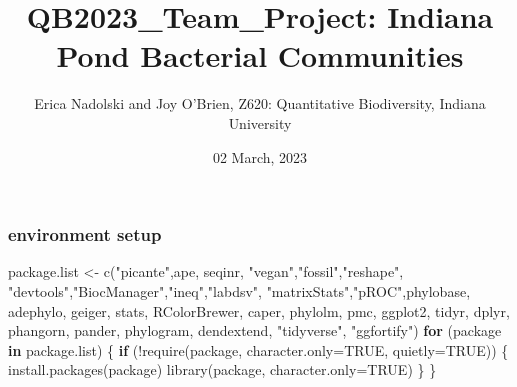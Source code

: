 \documentclass[
]{article}
\title{QB2023\_Team\_Project: Indiana Pond Bacterial Communities}
\author{Erica Nadolski and Joy O'Brien, Z620: Quantitative Biodiversity,
Indiana University}
\date{02 March, 2023}
\newenvironment{Shaded}{\begin{snugshade}}{\end{snugshade}}
\newcommand{\AttributeTok}[1]{\textcolor[rgb]{0.77,0.63,0.00}{#1}}
\newcommand{\ConstantTok}[1]{\textcolor[rgb]{0.00,0.00,0.00}{#1}}
\newcommand{\ControlFlowTok}[1]{\textcolor[rgb]{0.13,0.29,0.53}{\textbf{#1}}}
\newcommand{\FunctionTok}[1]{\textcolor[rgb]{0.00,0.00,0.00}{#1}}
\newcommand{\NormalTok}[1]{#1}
\newcommand{\OtherTok}[1]{\textcolor[rgb]{0.56,0.35,0.01}{#1}}
\newcommand{\SpecialCharTok}[1]{\textcolor[rgb]{0.00,0.00,0.00}{#1}}
\newcommand{\StringTok}[1]{\textcolor[rgb]{0.31,0.60,0.02}{#1}}
\begin{document}
\maketitle

\hypertarget{environment-setup}{%
\subsubsection{environment setup}\label{environment-setup}}

\begin{Shaded}
\begin{Highlighting}[]
\NormalTok{package.list }\OtherTok{\textless{}{-}} \FunctionTok{c}\NormalTok{(}\StringTok{"picante"}\NormalTok{,}\StringTok{\textquotesingle{}ape\textquotesingle{}}\NormalTok{, }\StringTok{\textquotesingle{}seqinr\textquotesingle{}}\NormalTok{, }\StringTok{"vegan"}\NormalTok{,}\StringTok{"fossil"}\NormalTok{,}\StringTok{"reshape"}\NormalTok{,}
                  \StringTok{"devtools"}\NormalTok{,}\StringTok{"BiocManager"}\NormalTok{,}\StringTok{"ineq"}\NormalTok{,}\StringTok{"labdsv"}\NormalTok{,}
                  \StringTok{"matrixStats"}\NormalTok{,}\StringTok{"pROC"}\NormalTok{,}\StringTok{\textquotesingle{}phylobase\textquotesingle{}}\NormalTok{, }\StringTok{\textquotesingle{}adephylo\textquotesingle{}}\NormalTok{, }\StringTok{\textquotesingle{}geiger\textquotesingle{}}\NormalTok{,}
                  \StringTok{\textquotesingle{}stats\textquotesingle{}}\NormalTok{, }\StringTok{\textquotesingle{}RColorBrewer\textquotesingle{}}\NormalTok{, }\StringTok{\textquotesingle{}caper\textquotesingle{}}\NormalTok{, }\StringTok{\textquotesingle{}phylolm\textquotesingle{}}\NormalTok{, }\StringTok{\textquotesingle{}pmc\textquotesingle{}}\NormalTok{, }
                  \StringTok{\textquotesingle{}ggplot2\textquotesingle{}}\NormalTok{, }\StringTok{\textquotesingle{}tidyr\textquotesingle{}}\NormalTok{, }\StringTok{\textquotesingle{}dplyr\textquotesingle{}}\NormalTok{, }\StringTok{\textquotesingle{}phangorn\textquotesingle{}}\NormalTok{, }\StringTok{\textquotesingle{}pander\textquotesingle{}}\NormalTok{, }
                  \StringTok{\textquotesingle{}phylogram\textquotesingle{}}\NormalTok{, }\StringTok{\textquotesingle{}dendextend\textquotesingle{}}\NormalTok{, }\StringTok{"tidyverse"}\NormalTok{, }\StringTok{"ggfortify"}\NormalTok{)}
\ControlFlowTok{for}\NormalTok{ (package }\ControlFlowTok{in}\NormalTok{ package.list) \{}
  \ControlFlowTok{if}\NormalTok{ (}\SpecialCharTok{!}\FunctionTok{require}\NormalTok{(package, }\AttributeTok{character.only=}\ConstantTok{TRUE}\NormalTok{, }\AttributeTok{quietly=}\ConstantTok{TRUE}\NormalTok{)) \{}
    \FunctionTok{install.packages}\NormalTok{(package)}
    \FunctionTok{library}\NormalTok{(package, }\AttributeTok{character.only=}\ConstantTok{TRUE}\NormalTok{)}
\NormalTok{  \}}
\NormalTok{\}}
\end{Highlighting}
\end{Shaded}
\end{document}
